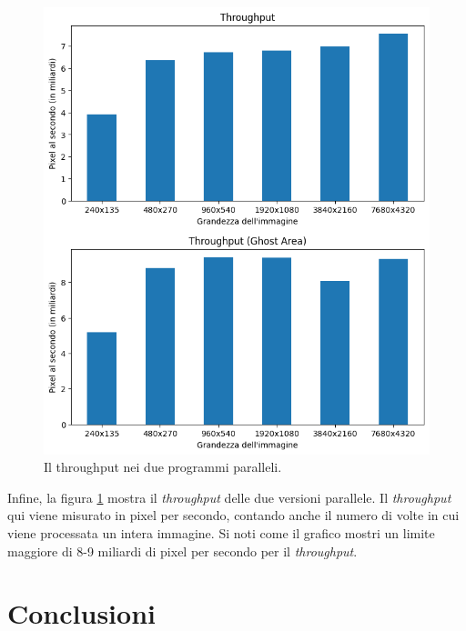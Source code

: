\documentclass[12pt,a4paper,openright,twoside]{report}
\begin{document}
\begin{figure}[h]
    \centering
    \includegraphics[width=\textwidth]{throughput.png}
    \caption{Il throughput nei due programmi paralleli.}
    \label{img:throughput}
\end{figure}

Infine, la figura \ref{img:throughput} mostra il \textit{throughput} delle due versioni parallele. Il \textit{throughput} qui viene misurato in pixel per secondo, contando anche il numero di volte in cui viene processata un intera immagine. Si noti come il grafico mostri un limite maggiore di 8-9 miliardi di pixel per secondo per il \textit{throughput}.

\chapter*{Conclusioni}


\end{document}
